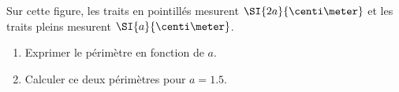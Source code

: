 
\begin{mental}
    
    Sur cette figure\cite{NRHooXFvgpp5}, les traits en pointillés mesurent $\SI{2a}{\centi\meter}$ et les traits pleins mesurent \( \SI{a}{\centi\meter}\).

\begin{center}
    
\end{center}

\begin{enumerate}
    \item
        
Exprimer le périmètre en fonction de $a$.

\item

Calculer ce deux périmètres pour \( a=1.5\).
\end{enumerate}
\end{mental}



